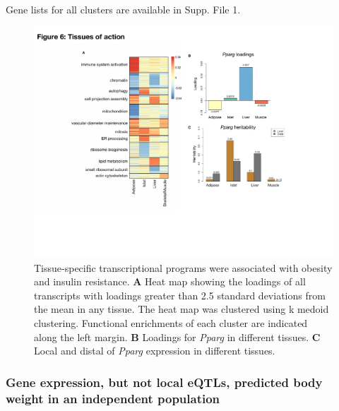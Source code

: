 \documentclass[
]{article}
\begin{document}
Gene lists for all clusters are available in Supp. File 1.

\begin{figure}[ht!]
\includegraphics[width=\textwidth]{Figures/Fig6_TOA.pdf} 
\caption{Tissue-specific transcriptional programs were associated 
with obesity and insulin resistance. \textbf{A} Heat map showing 
the loadings of all transcripts with loadings greater than 2.5 
standard deviations from the mean in any tissue. The heat map was 
clustered using k medoid clustering. Functional enrichments of each 
cluster are indicated along the left margin. \textbf{B} Loadings for 
\textit{Pparg} in different tissues. \textbf{C} Local and distal of 
\textit{Pparg} expression in different tissues.
}
\label{fig:toa}
\end{figure}

\subsubsection{Gene expression, but not local eQTLs, predicted body
weight in an independent
population}\label{gene-expression-but-not-local-eqtls-predicted-body-weight-in-an-independent-population}
\end{document}
